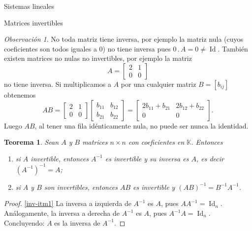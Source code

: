 \documentclass[a4paper,12pt,twoside,spanish,reqno]{amsbook}
\numberwithin{equation}{section}
\newtheorem{teorema}{Teorema}[section]
\theoremstyle{definition}
\theoremstyle{remark}
\newtheorem*{observacion*}{Observaci\'on}
\newcommand{\Id}{\operatorname{Id}}
\newcommand{\K}{\mathbb K}
\begin{document}
\begin{chapter}{Sistemas lineales}
\begin{section}{Matrices invertibles}
            \begin{observacion*}
                No toda matriz tiene inversa, por ejemplo  la  matriz nula (cuyos coeficientes son todos iguales a $0$) no tiene inversa pues $0\,.\, A= 0 \not= \Id$.  También existen matrices no nulas no invertibles,  por ejemplo la matriz 
                \begin{equation*}
                A = \begin{bmatrix} 2&1\\ 0&0\end{bmatrix}
                \end{equation*}
                no tiene inversa.
                Si  multiplicamos a $A$ por una cualquier matriz  $B =[b_{ij}]$ obtenemos
                \begin{equation*}
                AB = \begin{bmatrix} 2&1\\ 0&0\end{bmatrix}
                \begin{bmatrix} b_{11}&b_{12}\\ b_{21}&b_{22}\end{bmatrix} =
                \begin{bmatrix} 2b_{11}+b_{21}&2b_{12}+b_{22}\\0 &0\end{bmatrix}.
                \end{equation*}
                Luego $AB$, al tener una fila idénticamente nula, no puede ser nunca la identidad. 
            \end{observacion*}
            
            
            
            \begin{teorema}\label{th-prod-inv-impl-inv}
                Sean $A$ y $B$ matrices $n \times n$ con coeficientes en $\K$. Entonces
                \begin{enumerate}
                    \item \label{inv-itm1} si $A$ invertible,  entonces $A^{-1}$  es invertible y su inversa es $A$,  es decir $(A^{-1})^{-1}=A$;
                    \item \label{inv-itm2} si $A$ y $B$ son invertibles, entonces $AB$ es invertible y $(AB)^{-1} = B^{-1}A^{-1}$.
                \end{enumerate}
            \end{teorema}
                \begin{proof}
                    \ref{inv-itm1} La inversa a izquierda de $A^{-1}$ es $A$, pues $AA^{-1}=\Id_n$. Análogamente, la inversa a derecha de $A^{-1}$ es $A$, pues $A^{-1}A = \Id_n$. Concluyendo: $A$  es la inversa de $A^{-1}$.
                    

\end{proof}
\end{section}
\end{chapter}
\end{document}
